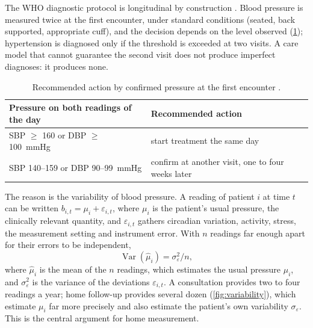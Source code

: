 \documentclass[11pt,a4paper,oneside]{report}
\begin{document}
The WHO diagnostic protocol is longitudinal by construction \parencite{who2023hypertension}. Blood pressure is measured twice at the first encounter, under standard conditions (seated, back supported, appropriate cuff), and the decision depends on the level observed (\cref{tab:protocol}); hypertension is diagnosed only if the threshold is exceeded at two visits. A care model that cannot guarantee the second visit does not produce imperfect diagnoses: it produces none.

\begin{table}[htbp]
\centering\small
\caption{Recommended action by confirmed pressure at the first encounter \parencite{who2023hypertension}.}\label{tab:protocol}
\begin{tabularx}{\textwidth}{@{}>{\raggedright\arraybackslash}p{6.2cm} X@{}}
\toprule
\textbf{Pressure on both readings of the day} & \textbf{Recommended action} \\
\midrule
SBP $\geq$ 160 or DBP $\geq$ 100~mmHg & start treatment the same day \\
SBP 140--159 or DBP 90--99~mmHg & confirm at another visit, one to four weeks later \\
\bottomrule
\end{tabularx}
\end{table}

The reason is the variability of blood pressure. A reading of patient $i$ at time $t$ can be written $b_{i,t} = \mu_i + \varepsilon_{i,t}$, where $\mu_i$ is the patient's usual pressure, the clinically relevant quantity, and $\varepsilon_{i,t}$ gathers circadian variation, activity, stress, the measurement setting and instrument error. With $n$ readings far enough apart for their errors to be independent,
\begin{equation}
  \operatorname{Var}(\hat\mu_i) = \sigma_\varepsilon^2 / n ,
\end{equation}
where $\hat\mu_i$ is the mean of the $n$ readings, which estimates the usual pressure $\mu_i$, and $\sigma_\varepsilon^2$ is the variance of the deviations $\varepsilon_{i,t}$. A consultation provides two to four readings a year; home follow-up provides several dozen (\cref{fig:variability}), which estimate $\mu_i$ far more precisely and also estimate the patient's own variability $\sigma_\varepsilon$. This is the central argument for home measurement.
\end{document}

